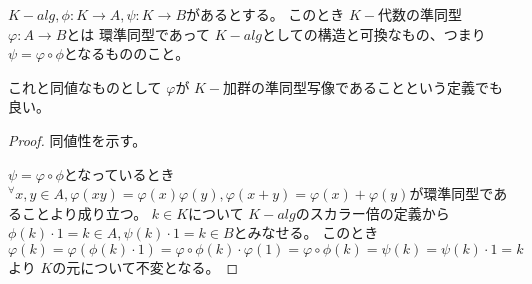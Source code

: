 \documentclass[../master_galois_theory]{subfiles}
\begin{document}
\begin{defi}
  $K-alg , \phi : K \longrightarrow A , \psi : K \longrightarrow B$があるとする。
  このとき $K-$代数の準同型 $\varphi : A \longrightarrow B$とは
  環準同型であって $K-alg$としての構造と可換なもの、つまり $\psi = \varphi \circ \phi$となるもののこと。

  これと同値なものとして $\varphi$が $K-$加群の準同型写像であることという定義でも良い。
\end{defi}

\begin{proof}
  同値性を示す。

  $\psi = \varphi \circ \phi$となっているとき
  ${}^\forall x , y \in A , \varphi(xy) = \varphi(x) \varphi(y) , \varphi(x + y) = \varphi(x) + \varphi(y)$が環準同型であることより成り立つ。
  $k \in K$について $K-alg$のスカラー倍の定義から $\phi(k) \cdot 1 = k \in A , \psi(k) \cdot 1 = k \in B$とみなせる。
  このとき $\varphi(k) = \varphi(\phi(k) \cdot 1) = \varphi \circ \phi(k) \cdot \varphi(1) = \varphi \circ \phi(k) = \psi(k) = \psi(k) \cdot 1 = k$より $K$の元について不変となる。

\end{proof}
\end{document}
